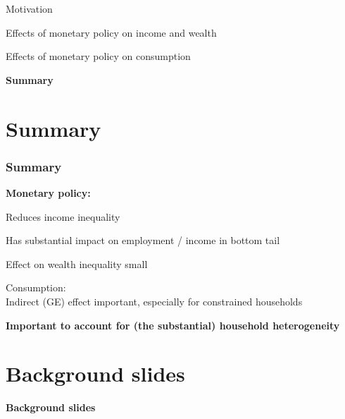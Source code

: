 \documentclass[pdflatex,aspectratio=169]{beamer}
\newcommand{\jemph}[1]{{\color{StataDarkBlue}#1}}
\newcommand{\jbemph}[1]{\textbf{\color{SlideNavy}#1}}
\begin{document}
\begin{frame}
\bi\setlength{\itemsep}{3mm}
\item Motivation
\item Effects of monetary policy on income and wealth
\item Effects of monetary policy on consumption
\item \jbemph{Summary}
\ei
\end{frame}


\section{Summary}
\begin{frame}\frametitle{\bf Summary}
\jbemph{\large Monetary policy:}\\
\bi\setlength{\itemsep}{3mm}
\item \jemph{Reduces income inequality}
\item Has substantial impact on employment / income in bottom tail
\item Effect on wealth inequality small
\item \jemph{Consumption:}\\ Indirect (GE) effect important, especially for constrained households
\ei
\pause

\vspace*{2.5mm}
\jbemph{\large Important to account for (the substantial) household heterogeneity}

\end{frame}



\section{Background slides}
\begin{frame}

\begin{center}
\Large
\jbemph{Background slides}
\end{center}

\end{frame}
\end{document}
